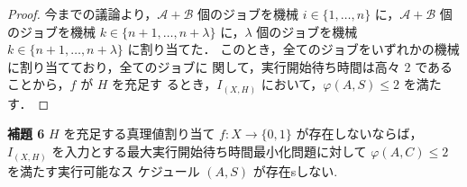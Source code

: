 \documentclass[12pt]{optlab-bachelor}
\begin{document}
\begin{proof}
    今までの議論より，$\mathcal{A} + \mathcal{B}$ 個のジョブを機械 $i \in
    \{1,\ldots,n\}$ に，$\mathcal{A} + \mathcal{B}$ 個のジョブを機械 $k \in\{n + 1, \ldots, n + \lambda\}$ に，$\lambda$ 個のジョブを機械 $k \in\{n + 1, \ldots, n + \lambda\}$ に割り当てた．
    このとき，全てのジョブをいずれかの機械に割り当てており，全てのジョブに
    関して，実行開始待ち時間は高々 2 であることから，$f$ が $H$ を充足す
    るとき，$I_{(X,H)}$ において，$\varphi(A,S) \le 2$ を満たす．
  \end{proof}

  \noindent \textbf{補題 6}
  $H$ を充足する真理値割り当て $f : X \to \{0,1\}$ が存在しないならば，
  $I_{(X,H)}$ を入力とする最大実行開始待ち時間最小化問題に対して
  $\varphi(A, C) \le 2$ を満たす実行可能なス
  ケジュール $(A, S)$ が存在sしない.\\
\end{document}
